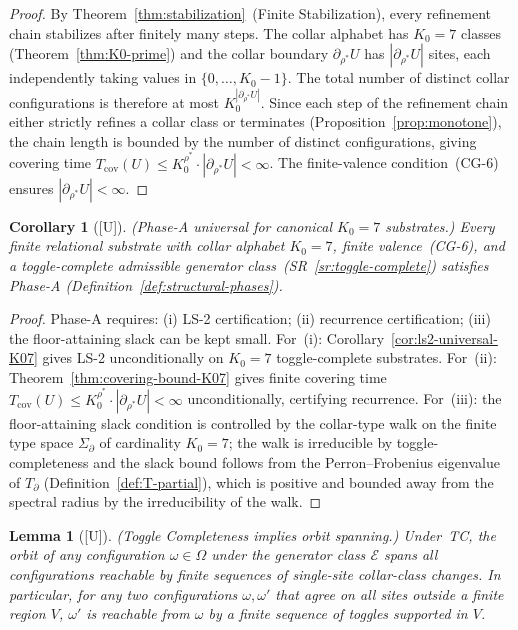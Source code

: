 \documentclass[12pt,oneside]{amsbook}
\theoremstyle{plain}
\newtheorem{lemma}[theorem]{Lemma}
\newtheorem{corollary}[theorem]{Corollary}
\theoremstyle{definition}
\theoremstyle{remark}
\newcommand{\status}[1]{\textup{[#1]}}
\begin{document}
\begin{proof}
By Theorem~\ref{thm:stabilization}~(Finite Stabilization), every
refinement chain stabilizes after finitely many steps.  The collar
alphabet has $K_0 = 7$ classes (Theorem~\ref{thm:K0-prime}) and the
collar boundary $\partial_{\rho^*} U$ has $|\partial_{\rho^*} U|$
sites, each independently taking values in $\{0,\ldots,K_0-1\}$.  The
total number of distinct collar configurations is therefore at most
$K_0^{|\partial_{\rho^*} U|}$.  Since each step of the refinement
chain either strictly refines a collar class or terminates
(Proposition~\ref{prop:monotone}), the chain length is bounded by
the number of distinct configurations, giving covering time
$T_{\mathrm{cov}}(U) \leq K_0^{\rho^*} \cdot |\partial_{\rho^*} U|
< \infty$.  The finite-valence condition~(CG-6) ensures
$|\partial_{\rho^*} U| < \infty$.
\end{proof}

\begin{corollary}[\status{U}]\label{cor:phase-a-universal-K07}
\textup{(Phase-A universal for canonical $K_0 = 7$ substrates.)}
Every finite relational substrate with collar alphabet $K_0 = 7$,
finite valence~(CG-6), and a toggle-complete admissible generator
class~(SR~\ref{sr:toggle-complete}) satisfies Phase-A
(Definition~\ref{def:structural-phases}).
\end{corollary}

\begin{proof}
Phase-A requires: (i) LS-2 certification; (ii) recurrence
certification; (iii) the floor-attaining slack can be kept small.
For~(i): Corollary~\ref{cor:ls2-universal-K07} gives LS-2
unconditionally on $K_0=7$ toggle-complete substrates.
For~(ii): Theorem~\ref{thm:covering-bound-K07} gives finite covering
time $T_{\mathrm{cov}}(U) \leq K_0^{\rho^*}\cdot|\partial_{\rho^*}
U| < \infty$ unconditionally, certifying recurrence.
For~(iii): the floor-attaining slack condition is controlled by the
collar-type walk on the finite type space $\Sigma_\partial$ of
cardinality $K_0 = 7$; the walk is irreducible by toggle-completeness
and the slack bound follows from the Perron--Frobenius eigenvalue of
$T_\partial$ (Definition~\ref{def:T-partial}), which is positive and
bounded away from the spectral radius by the irreducibility of the walk.
\end{proof}

\begin{lemma}[\status{U}]\label{lem:toggle-orbit}
\textup{(Toggle Completeness implies orbit spanning.)}  Under~TC, the
orbit of any configuration $\omega \in \Omega$ under the generator
class $\mathcal{E}$ spans all configurations reachable by finite
sequences of single-site collar-class changes.  In particular, for any
two configurations $\omega, \omega'$ that agree on all sites outside a
finite region $V$, $\omega'$ is reachable from $\omega$ by a finite
sequence of toggles supported in $V$.
\end{lemma}
\end{document}
